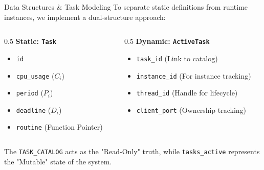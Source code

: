\begin{frame}{Data Structures \& Task Modeling}
    To separate static definitions from runtime instances, we implement a dual-structure approach:

    \begin{columns}
        \begin{column}{0.5\textwidth}
            \textbf{Static: \texttt{Task}}
            \begin{itemize}
                \item \texttt{id}
                \item \texttt{cpu\_usage} ($C_i$)
                \item \texttt{period} ($P_i$)
                \item \texttt{deadline} ($D_i$)
                \item \texttt{routine} (Function Pointer)
            \end{itemize}
        \end{column}
        \begin{column}{0.5\textwidth}
            \textbf{Dynamic: \texttt{ActiveTask}}
            \begin{itemize}
                \item \texttt{task\_id} (Link to catalog)
                \item \texttt{instance\_id} (For instance tracking)
                \item \texttt{thread\_id} (Handle for lifecycle)
                \item \texttt{client\_port} (Ownership tracking)
            \end{itemize}
        \end{column}
    \end{columns}
    \vspace{0.5cm}
    The \texttt{TASK\_CATALOG} acts as the "Read-Only" truth, while \texttt{tasks\_active} represents the "Mutable" state of the system.
\end{frame}

